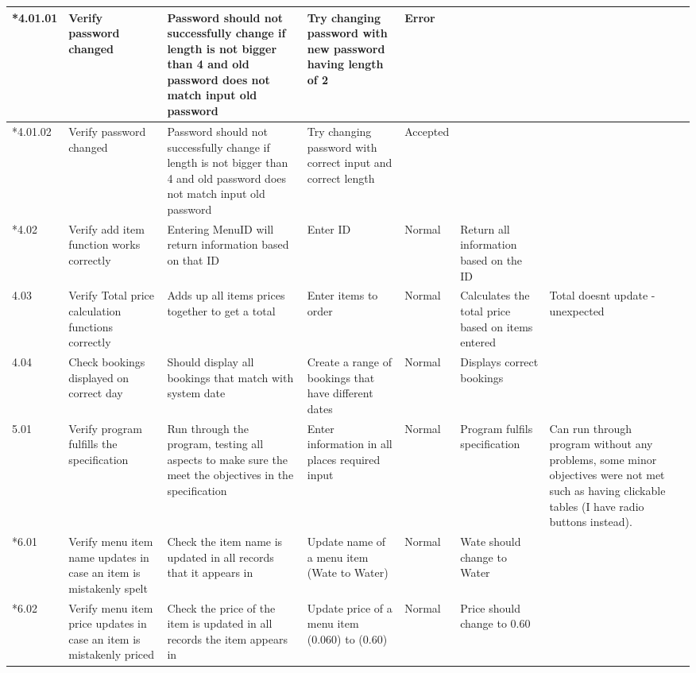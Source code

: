 \begin{landscape}
\begin{center}
\begin{longtable}{|p{1.5cm}|p{2.5cm}|p{2.5cm}|p{2cm}|p{2cm}|p{2cm}|p{2cm}|p{2cm}|}
      \rowcolor{gray}   *4.01.01 & Verify password changed & Password should not successfully change if length is not bigger than 4 and old password does not match input old password   &Try changing password with new password having length of 2&Error& & \\ \hline
      \rowcolor{gray}   *4.01.02 & Verify password changed & Password should not successfully change if length is not bigger than 4 and old password does not match input old password   &  Try changing password with correct input and correct length&Accepted  & & \\ \hline
       \rowcolor{gray}  *4.02 & Verify add item function works correctly & Entering MenuID will return information based on that ID & Enter ID &  Normal & Return all information based on the ID  & & \\ \hline
        4.03 & Verify Total price calculation functions correctly & Adds up all items prices together to get a total & Enter items to order &  Normal & Calculates the total price based on items entered  & Total doesnt update - unexpected & \\ \hline
	4.04 & Check bookings displayed on correct day & Should display all bookings that match with system date & Create a range of bookings that have different dates & Normal& Displays correct bookings & & \\ \hline
         5.01 & Verify program fulfills the specification & Run through the program, testing all aspects to make sure the meet the objectives in the specification & Enter information in all places required input &  Normal & Program fulfils specification  & Can run through program without any problems, some minor objectives were not met such as having clickable tables (I have radio buttons instead). & \\ \hline
	 \rowcolor{gray}*6.01 & Verify menu item name updates in case an item is mistakenly spelt & Check  the item name is updated in all records that it appears in & Update name of a menu item (Wate to Water) & Normal & Wate should change to Water & & \\ \hline
	 \rowcolor{gray}*6.02 & Verify menu item price updates in case an item is mistakenly priced & Check the price of the item is updated in all records the item appears in & Update price of a menu item (0.060) to (0.60) & Normal & Price should change to 0.60 & & \\ \hline







\end{longtable}
\end{center}
\end{landscape}
